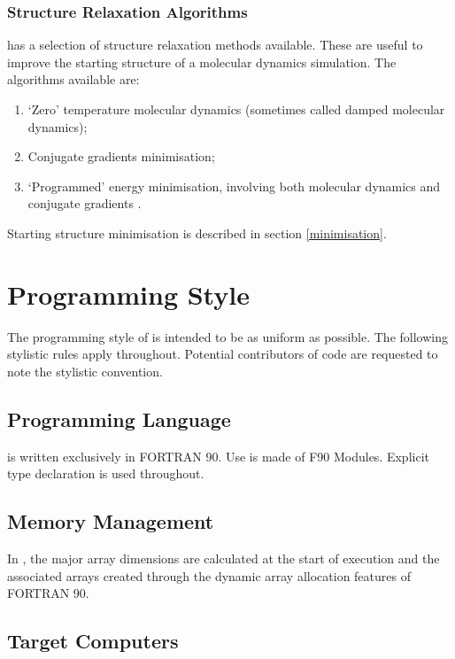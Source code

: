 \subsubsection{Structure Relaxation Algorithms}

\D{} has a selection of structure relaxation methods available. These 
are useful to improve the starting structure of a molecular dynamics 
simulation. The algorithms available are:

\begin{enumerate}
\item `Zero' temperature molecular dynamics (sometimes called damped molecular dynamics);
\item Conjugate gradients minimisation;
\item `Programmed' energy minimisation, involving both molecular dynamics and conjugate gradients .
\end{enumerate}

Starting structure minimisation is described in section \ref{minimisation}.

\section{Programming Style}

The programming style of \D{} is intended to be as uniform as
possible. The following stylistic rules apply throughout. Potential
contributors of code are requested to note the stylistic convention.

\subsection{Programming Language}

\D{} is written exclusively in FORTRAN 90. Use is made
of F90 Modules. Explicit type declaration is used throughout.

\subsection{Memory Management}

In \D{}, the major array dimensions are calculated at
the start of execution and the associated arrays created through the
dynamic array allocation features of FORTRAN 90.

\subsection{Target Computers}

